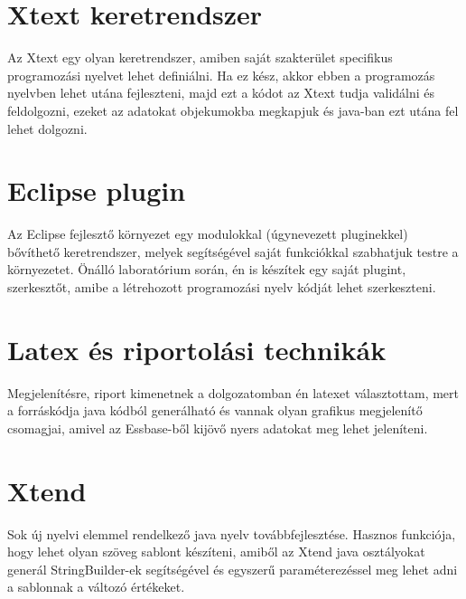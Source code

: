 \section{Xtext keretrendszer}
Az Xtext egy olyan keretrendszer, amiben saját szakterület specifikus programozási nyelvet lehet definiálni. Ha ez kész, akkor ebben a programozás nyelvben lehet utána fejleszteni, majd ezt a kódot az Xtext tudja validálni és feldolgozni, ezeket az adatokat objekumokba megkapjuk és java-ban ezt utána fel lehet dolgozni.

\section{Eclipse plugin}
Az Eclipse fejlesztő környezet egy modulokkal (úgynevezett pluginekkel) bővíthető keretrendszer, melyek segítségével saját funkciókkal szabhatjuk testre a környezetet. Önálló laboratórium során, én is készítek egy saját plugint, szerkesztőt, amibe a létrehozott programozási nyelv kódját lehet szerkeszteni.

\section{Latex és riportolási technikák}
Megjelenítésre, riport kimenetnek a dolgozatomban én latexet választottam, mert a forráskódja java kódból generálható és vannak olyan grafikus megjelenítő csomagjai, amivel az Essbase-ből kijövő nyers adatokat meg lehet jeleníteni.

\section{Xtend}
Sok új nyelvi elemmel rendelkező java nyelv továbbfejlesztése. Hasznos funkciója, hogy lehet olyan szöveg sablont készíteni, amiből az Xtend java osztályokat generál StringBuilder-ek segítségével és egyszerű paraméterezéssel meg lehet adni a sablonnak a változó értékeket.

